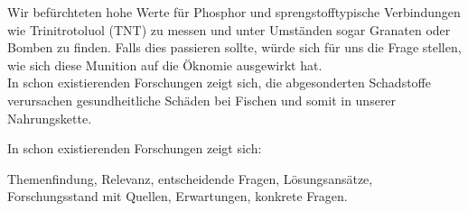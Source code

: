 Wir befürchteten hohe Werte für Phosphor und sprengstofftypische Verbindungen wie Trinitrotoluol (TNT) 
zu messen und unter Umständen sogar Granaten oder Bomben zu finden. Falls dies passieren sollte, würde 
sich für uns die Frage stellen, wie sich diese Munition auf die Öknomie ausgewirkt hat. \\

In schon existierenden Forschungen zeigt sich, die abgesonderten Schadstoffe verursachen gesundheitliche Schäden bei Fischen 
und somit in unserer Nahrungskette. 
%
%
%


In schon existierenden Forschungen\cite{munitionsbelastung} zeigt sich:




Themenfindung, Relevanz, entscheidende Fragen, Lösungsansätze, Forschungsstand mit Quellen, Erwartungen, konkrete Fragen.

